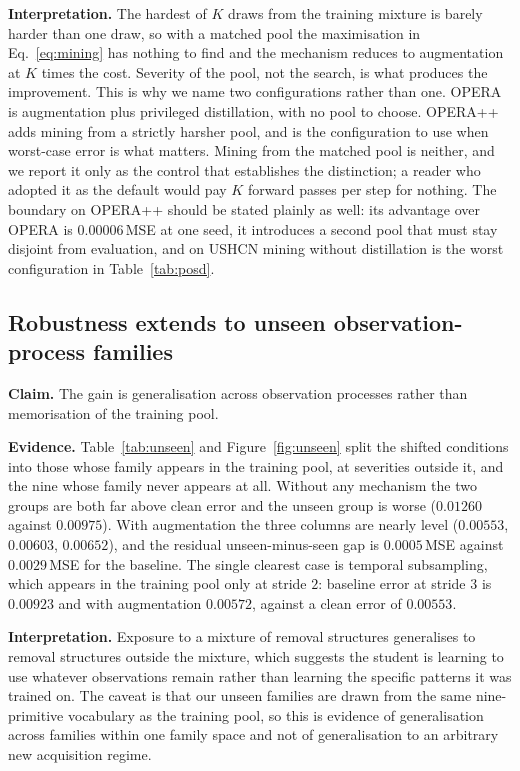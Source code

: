 \textbf{Interpretation.} The hardest of $K$ draws from the training mixture is barely harder than one draw, so
with a matched pool the maximisation in Eq.~\ref{eq:mining} has nothing to find and the mechanism reduces to
augmentation at $K$ times the cost. Severity of the pool, not the search, is what produces the improvement. This
is why we name two configurations rather than one. OPERA is augmentation plus privileged distillation, with no
pool to choose. OPERA++ adds mining from a strictly harsher pool, and is the configuration to use when worst-case
error is what matters. Mining from the matched pool is neither, and we report it only as the control that
establishes the distinction; a reader who adopted it as the default would pay $K$ forward passes per step for
nothing. The boundary on OPERA++ should be stated plainly as well: its advantage over OPERA is $0.00006$\,MSE at
one seed, it introduces a second pool that must stay disjoint from evaluation, and on USHCN mining without
distillation is the worst configuration in Table~\ref{tab:posd}.

\subsection{Robustness extends to unseen observation-process families}
\label{sec:q-unseen}

\textbf{Claim.} The gain is generalisation across observation processes rather than memorisation of the training
pool.

\textbf{Evidence.} Table~\ref{tab:unseen} and Figure~\ref{fig:unseen} split the shifted conditions into those
whose family appears in the training pool, at severities outside it, and the nine whose family never appears at
all. Without any mechanism the two groups are both far above clean error and the unseen group is worse
($0.01260$ against $0.00975$). With augmentation the three columns are nearly level ($0.00553$, $0.00603$,
$0.00652$), and the residual unseen-minus-seen gap is $0.0005$\,MSE against $0.0029$\,MSE for the baseline. The
single clearest case is temporal subsampling, which appears in the training pool only at stride $2$: baseline
error at stride $3$ is $0.00923$ and with augmentation $0.00572$, against a clean error of $0.00553$.

\textbf{Interpretation.} Exposure to a mixture of removal structures generalises to removal structures outside
the mixture, which suggests the student is learning to use whatever observations remain rather than learning the
specific patterns it was trained on. The caveat is that our unseen families are drawn from the same nine-primitive
vocabulary as the training pool, so this is evidence of generalisation across families within one family space and
not of generalisation to an arbitrary new acquisition regime.

